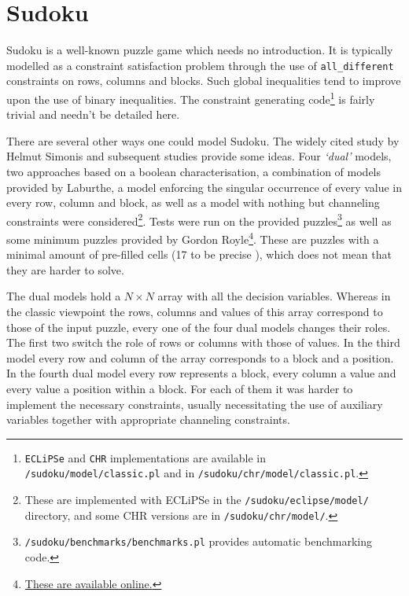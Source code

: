 \section{Sudoku}

Sudoku is a well-known puzzle game which needs no introduction. It is typically modelled as a constraint satisfaction problem through the use of \texttt{all\_different} constraints on rows, columns and blocks. Such global inequalities tend to improve upon the use of binary inequalities. The constraint generating code\footnote{\texttt{ECLiPSe} and \texttt{CHR} implementations are available in \texttt{/sudoku/model/classic.pl} and in \texttt{/sudoku/chr/model/classic.pl}.} is fairly trivial and needn't be detailed here. \\\par

There are several other ways one could model Sudoku. The widely cited study by Helmut Simonis \cite{article:simonis} and subsequent studies provide some ideas. Four \textit{`dual'} models, two approaches based on a boolean characterisation, a combination of models provided by Laburthe, a model enforcing the singular occurrence of every value in every row, column and block, as well as a model with nothing but channeling constraints were considered\footnote{These are implemented with ECLiPSe in the \texttt{/sudoku/eclipse/model/} directory, and some CHR versions are in \texttt{/sudoku/chr/model/}.}. Tests were run on the provided puzzles\footnote{\texttt{/sudoku/benchmarks/benchmarks.pl} provides automatic benchmarking code.} as well as some minimum puzzles provided by Gordon Royle\footnote{\href{http://rotor.di.unipi.it/cisterni/Shared\%20Documents/minsudoku.html}{These are available online.}}. These are puzzles with a minimal amount of pre-filled cells (17 to be precise \cite{article:mcguire}), which does not mean that they are harder to solve. \\\par

The dual models hold a $N\times N$ array with all the decision variables. Whereas in the classic viewpoint the rows, columns and values of this array correspond to those of the input puzzle, every one of the four dual models changes their roles. The first two switch the role of rows or columns with those of values. In the third model every row and column of the array corresponds to a block and a position. In the fourth dual model every row represents a block, every column a value and every value a position within a block. For each of them it was harder to implement the necessary constraints, usually necessitating the use of auxiliary variables together with appropriate channeling constraints.\\\par  

